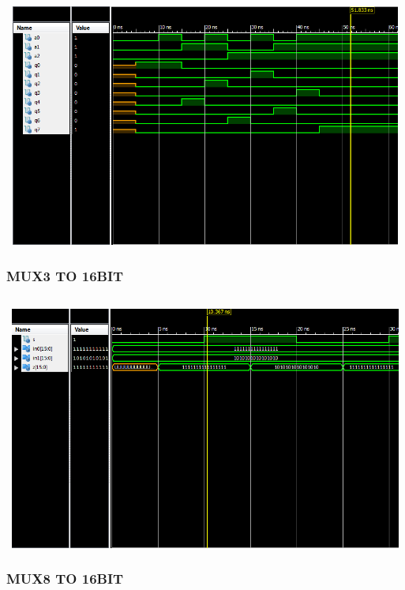 \documentclass{article}
\begin{document}
\begin{lstlisting}

\end{lstlisting}
\includegraphics[width=16cm, height=8cm]{test_decoder.png}

\pagebreak

\subsubsection{MUX3 TO 16BIT}\label{sec:result}

\begin{lstlisting}

\end{lstlisting}
\includegraphics[width=16cm, height=8cm]{test_mux3.png}
\pagebreak

\subsubsection{MUX8 TO 16BIT}\label{sec:result}
\end{document}
